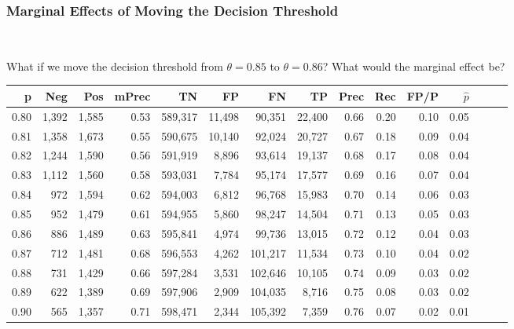 \subsubsection{Marginal Effects of Moving the Decision Threshold}

\

What if we move the decision threshold from $\theta = 0.85$ to $\theta = 0.86$?  What would the marginal effect be? 

\begin{center}
\begin{tabular}{rrrrrrrrrrrrrrr}
\toprule
p &     Neg &    Pos & mPrec &       TN &       FP &       FN &       TP &  Prec &   Rec &  FP/P & $\hat{p}$ \\
\midrule
0.80 &   1,392 &  1,585 &  0.53 &  589,317 &   11,498 &   90,351 &   22,400 &  0.66 &  0.20 &  0.10 &      0.05 \\
0.81 &   1,358 &  1,673 &  0.55 &  590,675 &   10,140 &   92,024 &   20,727 &  0.67 &  0.18 &  0.09 &      0.04 \\
0.82 &   1,244 &  1,590 &  0.56 &  591,919 &    8,896 &   93,614 &   19,137 &  0.68 &  0.17 &  0.08 &      0.04 \\
0.83 &   1,112 &  1,560 &  0.58 &  593,031 &    7,784 &   95,174 &   17,577 &  0.69 &  0.16 &  0.07 &      0.04 \\
0.84 &     972 &  1,594 &  0.62 &  594,003 &    6,812 &   96,768 &   15,983 &  0.70 &  0.14 &  0.06 &      0.03 \\ \hline
 0.85 &     952 &  1,479 &  0.61 &  594,955 &    5,860 &   98,247 &   14,504 &  0.71 &  0.13 &  0.05 &      0.03 \\ \hline
0.86 &     886 &  1,489 &  0.63 &  595,841 &    4,974 &   99,736 &   13,015 &  0.72 &  0.12 &  0.04 &      0.03 \\ \hline
0.87 &     712 &  1,481 &  0.68 &  596,553 &    4,262 &  101,217 &   11,534 &  0.73 &  0.10 &  0.04 &      0.02 \\
0.88 &     731 &  1,429 &  0.66 &  597,284 &    3,531 &  102,646 &   10,105 &  0.74 &  0.09 &  0.03 &      0.02 \\
0.89 &     622 &  1,389 &  0.69 &  597,906 &    2,909 &  104,035 &    8,716 &  0.75 &  0.08 &  0.03 &      0.02 \\
0.90 &     565 &  1,357 &  0.71 &  598,471 &    2,344 &  105,392 &    7,359 &  0.76 &  0.07 &  0.02 &      0.01 \\
\bottomrule
\end{tabular}
\end{center}

